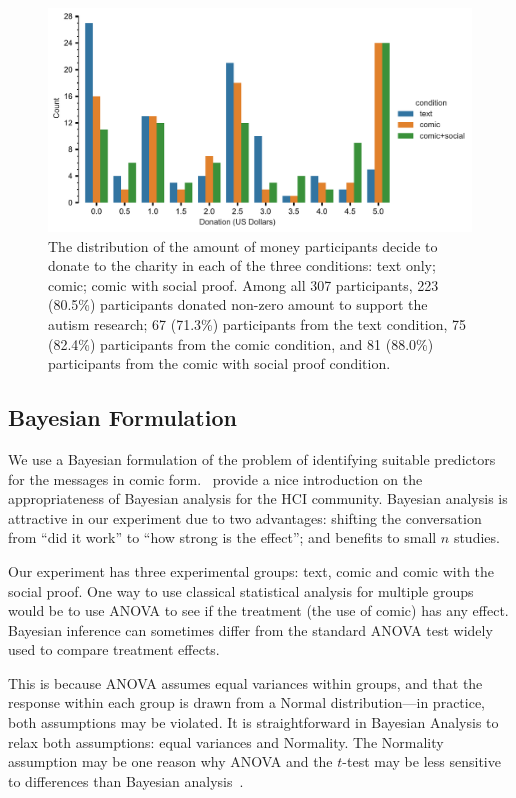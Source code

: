 \begin{figure}[htb]
	\includegraphics[width=1\textwidth]{./figures/contributions_across_conditions_font_fixed.pdf}
    \caption{The distribution of the amount of money participants decide to donate to the charity in each of the three conditions: text only; comic; comic with social proof. Among all 307 participants, 223 (80.5\%) participants donated non-zero amount to support the autism research; 67 (71.3\%) participants from the text condition, 75 (82.4\%) participants from the comic condition, and 81 (88.0\%) participants from the comic with social proof condition.
}
	\label{fig:contributions across conditions}
\end{figure}

\subsection{Bayesian Formulation}
\label{sub:Bayesian Formulation}
We use a Bayesian formulation of the problem of identifying suitable predictors for the messages in comic form.~\textcite{Kay2016} provide a nice introduction on the appropriateness of Bayesian analysis for the HCI community. Bayesian analysis is attractive in our experiment due to two advantages: shifting the conversation from ``did it work'' to ``how strong is the effect''; and benefits to small $n$ studies. 

Our experiment has three experimental groups: text, comic and comic with the social proof. One way to use classical statistical analysis for multiple groups would be to use ANOVA to see if the treatment (the use of comic) has any effect.  Bayesian inference can sometimes differ from the standard ANOVA test widely used to compare treatment effects.


This is because ANOVA assumes equal variances within groups, and that the response within each group is drawn from a Normal distribution---in practice, both assumptions may be violated.  It is straightforward in Bayesian Analysis to relax both assumptions: equal variances and Normality. The Normality assumption may be one reason why ANOVA and the $t$-test may be less sensitive to differences than Bayesian analysis~\parencite[][p. 470]{Kruschke2014}.


